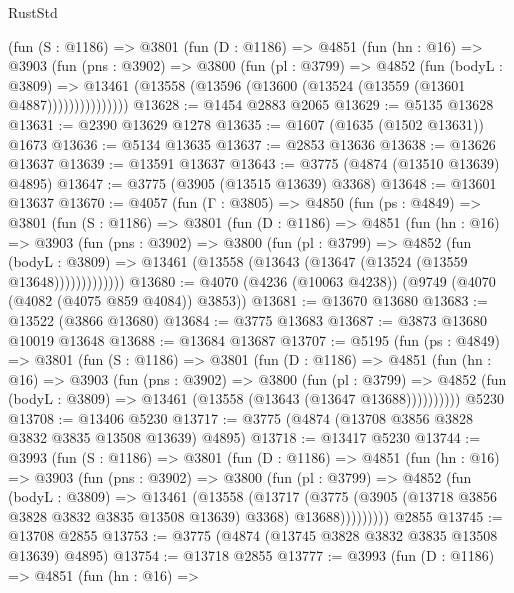 \begin{lexlean}{RustStd}
\begin{coremodule}
{\begin{coremodule}
{{{{{{{{{{{{{{{{{{{{{{{{{{{{{{{          (fun (S : @1186) =>
          @3801
            (fun (D : @1186) =>
            @4851
              (fun (hn : @16) =>
              @3903
                (fun (pns : @3902) =>
                @3800
                  (fun (pl : @3799) =>
                  @4852
                    (fun (bodyL : @3809) =>
                    @13461 (@13558 (@13596 (@13600 (@13524 (@13559 (@13601 @4887)))))))))))))))
@13628 := @1454 @2883 @2065
@13629 := @5135 @13628
@13631 := @2390 @13629 @1278
@13635 := @1607 (@1635 (@1502 @13631)) @1673
@13636 := @5134 @13635
@13637 := @2853 @13636
@13638 := @13626 @13637
@13639 := @13591 @13637
@13643 := @3775 (@4874 (@13510 @13639) @4895)
@13647 := @3775 (@3905 (@13515 @13639) @3368)
@13648 := @13601 @13637
@13670 := @4057
    (fun (Γ : @3805) =>
    @4850
      (fun (ps : @4849) =>
      @3801
        (fun (S : @1186) =>
        @3801
          (fun (D : @1186) =>
          @4851
            (fun (hn : @16) =>
            @3903
              (fun (pns : @3902) =>
              @3800
                (fun (pl : @3799) =>
                @4852
                  (fun (bodyL : @3809) =>
                  @13461 (@13558 (@13643 (@13647 (@13524 (@13559 @13648)))))))))))))
@13680 := @4070 (@4236 (@10063 @4238)) (@9749 (@4070 (@4082 (@4075 @859 @4084)) @3853))
@13681 := @13670 @13680
@13683 := @13522 (@3866 @13680)
@13684 := @3775 @13683
@13687 := @3873 @13680 @10019 @13648
@13688 := @13684 @13687
@13707 := @5195
    (fun (ps : @4849) =>
    @3801
      (fun (S : @1186) =>
      @3801
        (fun (D : @1186) =>
        @4851
          (fun (hn : @16) =>
          @3903
            (fun (pns : @3902) =>
            @3800
              (fun (pl : @3799) =>
              @4852 (fun (bodyL : @3809) => @13461 (@13558 (@13643 (@13647 @13688))))))))))
    @5230
@13708 := @13406 @5230
@13717 := @3775 (@4874 (@13708 @3856 @3828 @3832 @3835 @13508 @13639) @4895)
@13718 := @13417 @5230
@13744 := @3993
    (fun (S : @1186) =>
    @3801
      (fun (D : @1186) =>
      @4851
        (fun (hn : @16) =>
        @3903
          (fun (pns : @3902) =>
          @3800
            (fun (pl : @3799) =>
            @4852
              (fun (bodyL : @3809) =>
              @13461
                (@13558
                  (@13717
                    (@3775
                      (@3905 (@13718 @3856 @3828 @3832 @3835 @13508 @13639) @3368)
                      @13688)))))))))
    @2855
@13745 := @13708 @2855
@13753 := @3775 (@4874 (@13745 @3828 @3832 @3835 @13508 @13639) @4895)
@13754 := @13718 @2855
@13777 := @3993
    (fun (D : @1186) =>
    @4851
      (fun (hn : @16) =>
}}}}}}}}}}}}}}}}}}}}}}}}}}}}}}}
\end{coremodule}}
\end{coremodule}
\end{lexlean}
